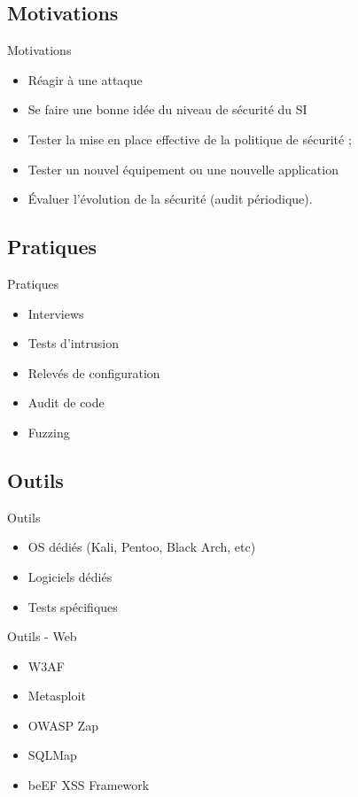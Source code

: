 \documentclass{beamer}
\begin{document}
	\subsection{Motivations}
	\begin{frame}{Motivations}
		\begin{itemize}
			\item Réagir à une attaque
			\item Se faire une bonne idée du niveau de sécurité du SI
			\item Tester la mise en place effective de la politique de sécurité ;
			\item Tester un nouvel équipement ou une nouvelle application
			\item Évaluer l'évolution de la sécurité (audit périodique).
		\end{itemize}
	\end{frame}
	\subsection{Pratiques}
	\begin{frame}{Pratiques}
		\begin{itemize}
			\item Interviews
			\item Tests d'intrusion
			\item Relevés de configuration
			\item Audit de code
			\item Fuzzing
		\end{itemize}
	\end{frame}
	\subsection{Outils}
	\begin{frame}{Outils}
		\begin{itemize}
			\item OS dédiés (Kali, Pentoo, Black Arch, etc)
			\item Logiciels dédiés
			\item Tests spécifiques			
		\end{itemize}
	\end{frame}
	\begin{frame}{Outils - Web}
	\begin{itemize}
		\item W3AF
		\item Metasploit
		\item OWASP Zap	
		\item SQLMap
		\item beEF XSS Framework
	\end{itemize}
	\end{frame}
\end{document}
